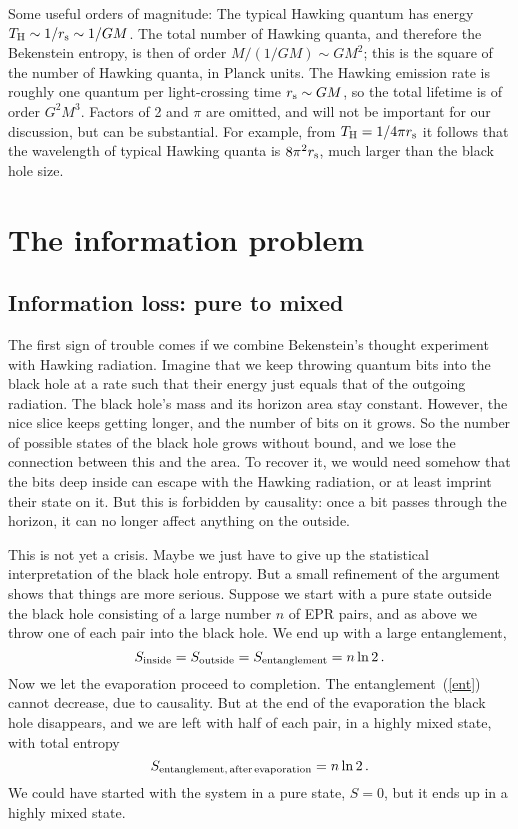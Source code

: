 \documentclass[12pt]{article}
\newcommand{\sect}[1]{\section{#1}\setcounter{equation}{0}}
\newcommand{\be}{\begin{equation}}
\newcommand{\ee}{\end{equation}}
\newcommand{\rmx}{\rm}
\newcommand{\rs}{r_{\rmx s}}
\begin{document}
Some useful orders of magnitude: The typical Hawking quantum has energy  $T_{\rm H} \sim 1/\rs \sim 1/GM$.  The total number of Hawking quanta, and therefore the Bekenstein entropy, is then of order $M/(1/GM) \sim GM^2$; this is the square of the number of Hawking quanta, in Planck units.  The Hawking emission rate is roughly one quantum per light-crossing time $\rs \sim GM$, so the total lifetime is of order $G^2 M^3$.    Factors of 2 and $\pi$ are omitted, and will not be important for our discussion, but can be substantial.  For example, from $T_{\rmx H} = 1/4\pi r_{\rmx s}$ it follows that the wavelength of typical Hawking quanta is $8 \pi^2 \rs$, much larger than the black hole size.

\sect{The information problem}

\subsection{Information loss: pure to mixed}

The first sign of trouble comes if we combine Bekenstein's thought experiment with Hawking radiation.  Imagine that we keep throwing quantum bits into the black hole at a rate such that their energy just equals that of the outgoing radiation.   The black hole's mass and its horizon area stay constant.  However, the nice slice keeps getting longer, and the number of bits on it grows.  So the number of possible states of the black hole grows without bound, and we lose the connection between this and the area.  To recover it, we would need somehow that the bits deep inside can escape with the Hawking radiation, or at least imprint their state on it.   But this is forbidden by causality: once a bit passes through the horizon, it can no longer affect anything on the outside.

This is not yet a crisis.  Maybe we just have to give up the statistical interpretation of the black hole entropy.  But a small refinement of the argument shows that things are more serious.  Suppose we start with a pure state outside the black hole consisting of a large number $n$ of EPR pairs, and as above we throw one of each pair into the black hole.   We end up with a large entanglement,
\be
S_{\rm inside} = S_{\rm outside} = S_{\rm entanglement} = n \ln 2 \,. \label{ent}
\ee
Now we let the evaporation proceed to completion.  The entanglement~(\ref{ent}) cannot decrease, due to causality.  But at the end of the evaporation the black hole disappears, and we are left with half of each pair, in a highly mixed state, with total entropy
\be
S_{\rm entanglement,\, after\,evaporation} = n \ln 2 \,.
\ee
We could have started with the system in a pure state, $S=0$, but it ends up in a highly mixed state. 
\end{document}
